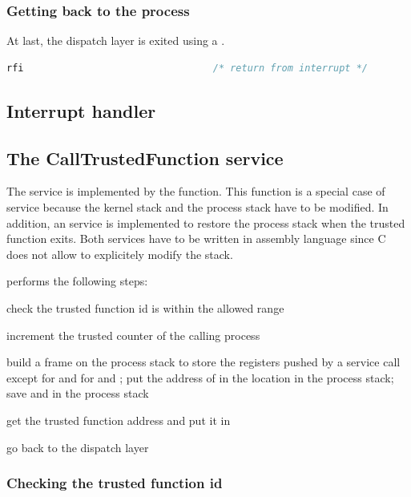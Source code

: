 \subsubsection{Getting back to the process}

At last, the dispatch layer is exited using a .

\begin{lstlisting}[language=C]
  rfi                                 /* return from interrupt */
\end{lstlisting}

\subsection{Interrupt handler}

\subsection{The CallTrustedFunction service}

The  service is implemented by the  function. This function is a special case of service because the kernel stack and the process stack have to be modified. In addition, an  service is implemented to restore the process stack when the trusted function exits. Both services have to be written in assembly language since C does not allow to explicitely modify the stack.

 performs the following steps:

\begin{penum}
\item check the trusted function id is within the allowed range
\item increment the trusted counter of the calling process
\item build a frame on the process stack to store the registers pushed by a service call except for  and for  and ; put the address of  in the  location in the process stack; save  and  in the process stack
\item get the trusted function address and put it in 
\item go back to the dispatch layer
\end{penum}

\subsubsection{Checking the trusted function id}

